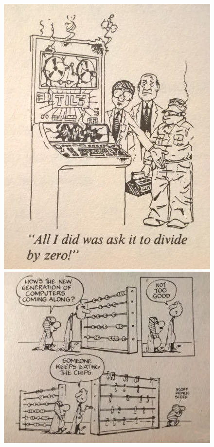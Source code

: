 \begin{figure}[H]
	\centering
	\begin{multicols}{2}
	\includegraphics[scale=0.2, left]{./image/dividebyzero.jpg}
	\includegraphics[scale=0.12, right]{./image/newgencomputer.jpg}
	\end{multicols}
\end{figure}
